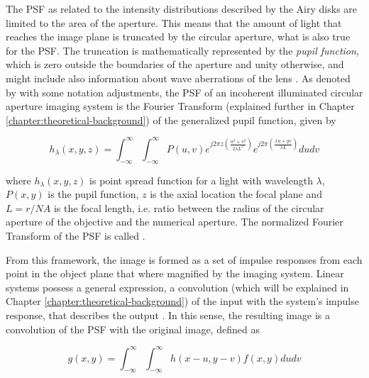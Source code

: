 The PSF as related to the intensity distributions described by the Airy disks are limited to the area of the aperture. This means that the amount of light that reaches the image plane is truncated by the circular aperture, what is also true for the PSF. The truncation is mathematically represented by the \emph{pupil function}, which is zero outside the boundaries of the aperture and unity otherwise, and might include also information about wave aberrations of the lens \cite{goodman1996introduction}. As denoted by  with some notation adjustments, the PSF of an incoherent illuminated circular aperture imaging system is the Fourier Transform (explained further in Chapter \ref{chapter:theoretical-background}) of the generalized pupil function, given by

\begin{equation}
\label{eqn:incoherent_psf}
h_{\lambda}(x,y,z) = \int_{-\infty}^{\infty}
                     \int_{-\infty}^{\infty}
         P(u,v)
         e^{j 2 \pi z
            \left(
                \frac{u^{2} + v^{2}}{2 \lambda L^{2}}        
            \right)
        }
        e^{j 2 \pi
            \left(
                \frac{xu + yv}{\lambda L}        
            \right)
        }
        du dv
\end{equation}

\noindent where $h_{\lambda}(x,y,z)$ is point spread function for a light with wavelength $\lambda$, $P(x,y)$ is the pupil function, $z$ is the axial location the focal plane and $L = r / NA$ is the focal length, i.e. ratio between the radius of the circular aperture of the objective and the numerical aperture. The normalized Fourier Transform of the PSF is called  \cite{castleman1996digital}.

From this framework, the image is formed as a set of impulse responses from each point in the object plane that where magnified by the imaging system. Linear systems possess a general expression, a convolution (which will be explained in Chapter \ref{chapter:theoretical-background}) of the input with the system's impulse response, that describes the output \cite{brigham1988fast}. In this sense, the resulting image is a convolution of the PSF with the original image, defined as

\begin{equation}
\label{eqn:image_formation_convolution}
g(x,y) = \int_{-\infty}^{\infty}
         \int_{-\infty}^{\infty}
         h(x-u, y-v)f(x,y)du dv
\end{equation}

